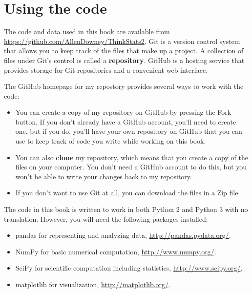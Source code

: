 \documentclass[12pt]{book}
\begin{document}
\section*{Using the code}

The code and data used in this book are available from
\url{https://github.com/AllenDowney/ThinkStats2}.  Git is a version
control system that allows you to keep track of the files that
make up a project.  A collection of files under Git's control is
called a {\bf repository}.  GitHub is a hosting service that provides
storage for Git repositories and a convenient web interface.

The GitHub homepage for my repostory provides several ways to
work with the code:

\begin{itemize}

\item You can create a copy of my repository
on GitHub by pressing the {\sf Fork} button.  If you don't already
have a GitHub account, you'll need to create one, but if you do, you'll
have your own repository on GitHub that you can use to keep track
of code you write while working on this book.

\item You can also {\bf clone}
my repository, which means that you create a copy of the files on
your computer.  You don't need a GitHub account to do this, but you
won't be able to write your changes back to my repository.

\item If you don't want to use Git at all, you can download the files
in a Zip file.

\end{itemize}

The code in this book is written to work in both Python 2 and Python 3
with no translation.  However, you will need the following packages
installed: 

\begin{itemize}

\item pandas for representing and analyzing data,
  \url{http://pandas.pydata.org/}.

\item NumPy for basic numerical computation, \url{http://www.numpy.org/}.

\item SciPy for scientific computation including statistics,
  \url{http://www.scipy.org/}.

\item matplotlib for visualization, \url{http://matplotlib.org/}.

\end{itemize}
\end{document}
